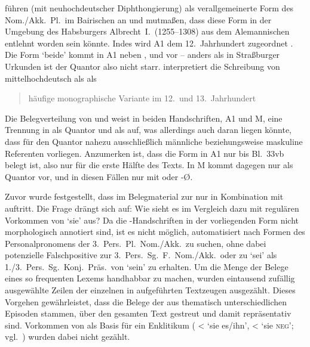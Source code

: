 \citet[396--397]{ksw2} führen  (mit neuhochdeutscher
Diphthongierung) als ver\-all\-gemeinerte
Form des Nom./Akk.\ Pl.\ im Bairischen an und mutmaßen, dass diese
Form in der Umgebung des Habsburgers Albrecht~I.\ (1255--1308) aus dem
Alemannischen entlehnt worden sein könnte. Indes wird A1 dem
12.~Jahrhundert zugeordnet \autocite{kcdigital,wolf:kckat}. Die Form 
`beide' kommt in A1 neben ,  und  vor -- anders
als in Straßburger Urkunden ist der Quantor also nicht starr.
\citeauthor{wiesinger2001} interpretiert die Schreibung von
mittelhochdeutsch  als  als
\blockcquote[103]{wiesinger2001}{häufige mono\-graphische Variante \textelp{}
im 12.\ und 13.~Jahrhundert}.

Die Belegverteilung von  und  weist in beiden
Handschriften, A1 und M, eine Trennung in  als Quantor und
 als  auf, was allerdings auch daran liegen
könnte, dass für den Quantor nahezu ausschließlich männliche beziehungsweise
maskuline Referenten vorliegen. Anzumerken ist, dass die Form  in A1
nur bis Bl.~33vb belegt ist, also nur für die erste Hälfte des Texts. In M
kommt  dagegen nur als Quantor vor, und in diesen Fällen nur mit
 oder -Ø.


Zuvor wurde festgestellt, dass im Belegmaterial zur \KC{} nur
 in Kombination mit  auftritt. Die Frage drängt sich
auf: Wie sieht es im Vergleich dazu mit regulären Vorkommen von `sie' aus? Da
die \KC{}-Hand\-schrif\-ten in der vorliegenden Form nicht morphologisch
annotiert sind, ist es nicht möglich, automatisiert nach Formen des
Personal\-pronomens der 3.~Pers.\ Pl.\ Nom./Akk.\ zu
suchen, ohne dabei potenzielle Falschpositive zur 3.~Pers.\
Sg.~F.\ Nom./Akk.\ oder zu  `sei' als 1./3.~Pers.\ Sg.\ Konj.\ Präs.\
von  `sein' zu erhalten. Um die Menge der Belege eines so frequenten
Lexems handhabbar zu machen, wurden eintausend zufällig ausgewählte Zeilen der
einzelnen in \tabref{tab:sieprn} aufgeführten Textzeugen ausgezählt. Dieses
Vorgehen gewährleistet, dass die Belege der \isi{Stichprobe} aus thematisch
unterschiedlichen Episoden stammen, über den gesamten Text gestreut und damit
repräsentativ sind. Vorkommen von \norm{si} als Basis für ein Enklitikum
(\norm{siȥ/-n} < \norm{si eȥ/in} `sie es/ihn', \norm{sine} < \norm{si ne} `sie
\textsc{neg}'; vgl.~\cites[384--387]{ksw2}[31]{paul2007}) wurden dabei nicht
gezählt.

